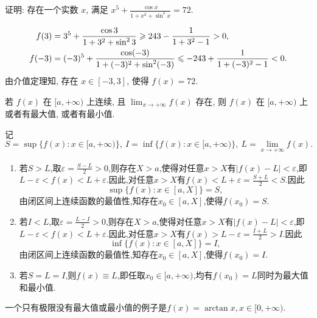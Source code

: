 \begin{exercise}[2.C.6]
    证明: 存在一个实数 $x$, 满足 $x^5 + \frac{\cos x}{1+x^2+\sin^2 x} = 72$.
\end{exercise}

\begin{solution}
    \begin{align*}
        f(3) &= 3^5 + \frac{\cos 3}{1+3^2+\sin^2 3} \geqslant 243 - \frac{1}{1+3^2-1} > 0,\\
        f(-3) &= (-3)^5 + \frac{\cos (-3)}{1+(-3)^2+\sin^2 (-3)} \leqslant -243 + \frac{1}{1+(-3)^2-1} < 0.
    \end{align*}
    由介值定理知, 存在 $x \in [-3,3]$, 使得 $f(x) = 72$.
\end{solution}

\begin{exercise}[2.C.7]
    若 $f(x)$ 在 $[a, +\infty)$ 上连续, 且 $\lim_{x \to +\infty} f(x)$ 存在, 则 $f(x)$ 在 $[a, +\infty)$ 上或者有最大值, 或者有最小值.
\end{exercise}

\begin{solution}
    记$$S = \sup \{ f(x): x \in [a, +\infty) \}, \ I = \inf \{ f(x): x \in [a, +\infty) \}, \ L = \lim_{x \to +\infty} f(x).$$
    \begin{enumerate}
        \item 若$S > L$,取$\varepsilon = \frac{S-L}{2} > 0$,则存在$X > a$,使得对任意$x > X$有$|f(x)-L| < \varepsilon$,即$L - \varepsilon < f(x) < L + \varepsilon$.因此,对任意$x > X$有$f(x) < L + \varepsilon = \frac{S+L}{2} < S$.因此$$\sup \{ f(x): x \in [a, X] \} = S,$$由闭区间上连续函数的最值性,知存在$x_0 \in [a,X]$,使得$f(x_0) = S$.
        \item 若$I < L$,取$\varepsilon = \frac{L-I}{2} > 0$,则存在$X > a$,使得对任意$x > X$有$|f(x)-L| < \varepsilon$,即$L - \varepsilon < f(x) < L + \varepsilon$.因此,对任意$x > X$有$f(x) > L - \varepsilon = \frac{I+L}{2} > I$.因此$$\inf \{ f(x): x \in [a, X] \} = I,$$由闭区间上连续函数的最值性,知存在$x_0 \in [a,X]$,使得$f(x_0) = I$.
        \item 若$S = L = I$,则$f(x) \equiv L$,即任取$x_0 \in [a,+\infty)$,均有$f(x_0) = L$同时为最大值和最小值.
    \end{enumerate}
    \begin{remark}
        一个只有极限没有最大值或最小值的例子是$f(x) = \arctan x, x \in [0,+\infty)$.
    \end{remark}
\end{solution}

